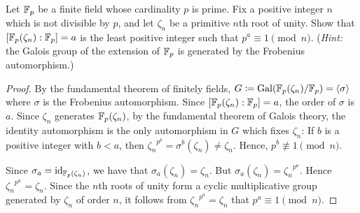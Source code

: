 \begin{problem}
Let $\mathbb{F}_p$ be a finite field whose cardinality $p$ is prime. Fix a
positive integer $n$ which is not divisible by $p$, and let $\zeta_n$ be a
primitive $n$th root of unity. Show that
$\left[\mathbb{F}_p(\zeta_n):\mathbb{F}_p\right]=a$ is the least positive integer such
that $p^a\equiv 1\pmod{n}$. (\emph{Hint:} the Galois group of the extension
of $\mathbb{F}_p$ is generated by the Frobenius automorphism.)
\end{problem}
\begin{proof}
By the fundamental theorem of finitely fields,
$G\coloneqq\operatorname{Gal}(\mathbb{F}_p(\zeta_n)/\mathbb{F}_p)=\langle\sigma\rangle$ where $\sigma$
is the Frobenius automorphism. Since
$\left[\mathbb{F}_p(\zeta_n):\mathbb{F}_p\right]=a$, the order of $\sigma$ is
$a$. Since $\zeta_n$ generates $\mathbb{F}_p(\zeta_n)$, by the fundamental
theorem of Galois theory, the identity automorphism is the only
automorphism in $G$ which fixes $\zeta_n$: If $b$ is a positive integer
with $b<a$, then ${\zeta_n}^{p^b}=\sigma^b(\zeta_n)\neq\zeta_n$. Hence,
$p^b\nequiv 1\pmod{n}$.

Since $\sigma_a=\operatorname{id}_{\mathbb{F}_{p}(\zeta_n)}$, we have that
$\sigma_a(\zeta_n)=\zeta_n$. But $\sigma_a(\zeta_n)={\zeta_n}^{p^a}$. Hence
${\zeta_n}^{p^n}=\zeta_n$. Since the $n$th roots of unity form a cyclic
multiplicative group generated by $\zeta_n$ of order $n$, it follows from
${\zeta_n}^{p^a}=\zeta_n$ that $p^a\equiv 1\pmod{n}$.
\end{proof}

